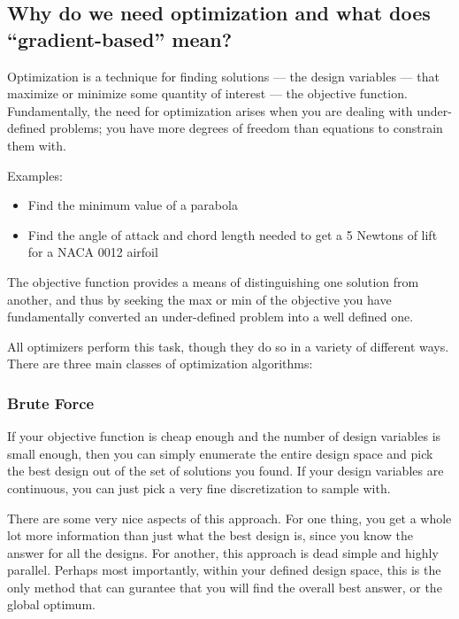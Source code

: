 \documentclass[conf]{new-aiaa}
\begin{document}
    \subsection*{Why do we need optimization and what does ``gradient-based'' mean?}
        
        Optimization is a technique for finding solutions --- the design variables --- that maximize or minimize some quantity of interest  --- the objective function. 
        Fundamentally, the need for optimization arises when you are dealing with under-defined problems; you have more degrees of freedom than equations to constrain them with. 

        Examples: 
        \begin{itemize}
            \item Find the minimum value of a parabola
            \item Find the angle of attack and chord length needed to get a 5 Newtons of lift for a NACA 0012 airfoil
        \end{itemize}

        The objective function provides a means of distinguishing one solution from another, 
        and thus by seeking the max or min of the objective you have fundamentally converted an under-defined problem into a well defined one. 

        All optimizers perform this task, though they do so in a variety of different ways. 
        There are three main classes of optimization algorithms: 
        
        \subsubsection{Brute Force}
            If your objective function is cheap enough and the number of design variables is small enough, then you can simply enumerate the entire design space and pick the best design out of the set of solutions you found. 
            If your design variables are continuous, you can just pick a very fine discretization to sample with. 

            There are some very nice aspects of this approach. For one thing, you get a whole lot more information than just what the best design is, since you know the answer for all the designs. 
            For another, this approach is dead simple and highly parallel. 
            Perhaps most importantly, within your defined design space, this is the only method that can gurantee that you will find the overall best answer, or the global optimum. 
\end{document}
